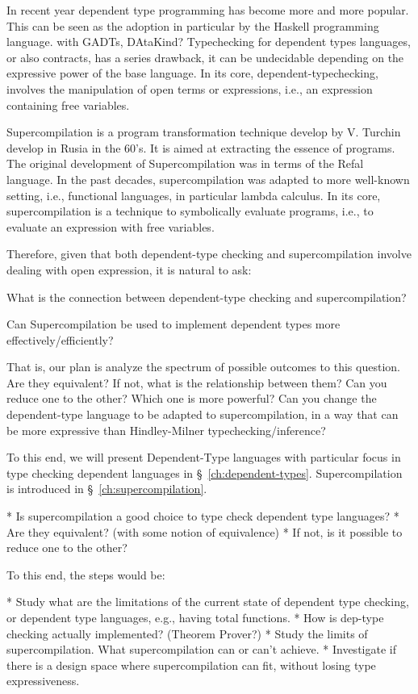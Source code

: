 In recent year dependent type programming has become more and more popular.
This can be seen as the adoption in particular by the Haskell programming language.
with GADTs, DAtaKind?
Typechecking for dependent types languages, or also contracts, has a series drawback, it can be undecidable depending on the expressive power of the base language.
In its core, dependent-typechecking, involves the manipulation of open terms or expressions, i.e., an expression containing free variables.

Supercompilation is a program transformation technique develop by V. Turchin develop in Rusia in the 60's. It is aimed at extracting the essence of programs.
The original development of Supercompilation was in terms of the Refal language.
In the past decades, supercompilation was adapted to more well-known setting, i.e., functional languages, in particular lambda calculus.
In its core, supercompilation is a technique to symbolically evaluate programs, i.e., to evaluate an expression with free variables.

Therefore, given that both dependent-type checking and supercompilation involve dealing with open expression, it is natural to ask:

What is the connection between dependent-type checking and supercompilation?

Can Supercompilation be used to implement dependent types more effectively/efficiently?

That is, our plan is analyze the spectrum of possible outcomes to this question.
Are they equivalent?
If not, what is the relationship between them? Can you reduce one to the other?
Which one is more powerful?
Can you change the dependent-type language to be adapted to supercompilation, in a way that can be more expressive than Hindley-Milner typechecking/inference?

To this end, we will present Dependent-Type languages with particular focus in type checking dependent languages in \S~\ref{ch:dependent-types}.
Supercompilation is introduced in \S~\ref{ch:supercompilation}.



* Is supercompilation a good choice to type check dependent type languages?
* Are they equivalent? (with some notion of equivalence)
* If not, is it possible to reduce one to the other?

To this end, the steps would be:

* Study what are the limitations of the current state of dependent type checking, or dependent type languages, e.g., having total functions.
* How is dep-type checking actually implemented? (Theorem Prover?)
* Study the limits of supercompilation. What supercompilation can or can't achieve.
* Investigate if there is a design space where supercompilation can fit, without losing type expressiveness.




